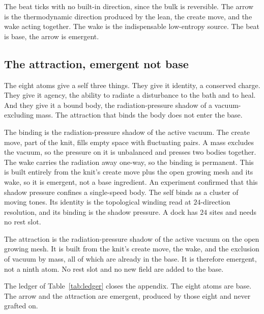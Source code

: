 \begin{result}
The beat ticks with no built-in direction, since the bulk is reversible. The arrow is the thermodynamic direction produced by the lean, the create move, and the wake acting together. The wake is the indispensable low-entropy source. The beat is base, the arrow is emergent.
\end{result}

\subsection{The attraction, emergent not base}

The eight atoms give a self three things. They give it identity, a conserved charge. They give it agency, the ability to radiate a disturbance to the bath and to heal. And they give it a bound body, the radiation-pressure shadow of a vacuum-excluding mass. The attraction that binds the body does not enter the base.

The binding is the radiation-pressure shadow of the active vacuum. The create move, part of the knit, fills empty space with fluctuating pairs. A mass excludes the vacuum, so the pressure on it is unbalanced and presses two bodies together. The wake carries the radiation away one-way, so the binding is permanent. This is built entirely from the knit's create move plus the open growing mesh and its wake, so it is emergent, not a base ingredient. An experiment confirmed that this shadow pressure confines a single-speed body. The self binds as a cluster of moving tones. Its identity is the topological winding read at $24$-direction resolution, and its binding is the shadow pressure. A dock has $24$ sites and needs no rest slot.

\begin{result}
The attraction is the radiation-pressure shadow of the active vacuum on the open growing mesh. It is built from the knit's create move, the wake, and the exclusion of vacuum by mass, all of which are already in the base. It is therefore emergent, not a ninth atom. No rest slot and no new field are added to the base.
\end{result}

The ledger of Table~\ref{tab:ledger} closes the appendix. The eight atoms are base. The arrow and the attraction are emergent, produced by those eight and never grafted on.

